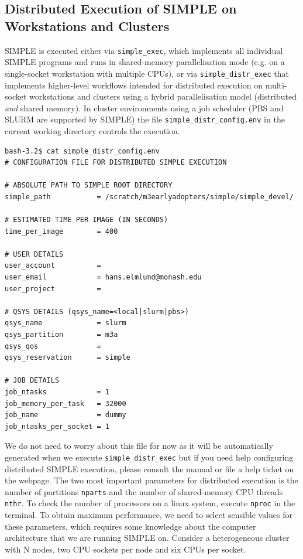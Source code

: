 \documentclass[a4paper,11pt]{article}
\begin{document}
\subsection{Distributed Execution of SIMPLE on Workstations and Clusters}
SIMPLE is executed either via \texttt{simple\_exec}, which implements all individual SIMPLE programs and runs in shared-memory parallelisation mode (e.g. on a single-socket workstation with multiple CPUs), or via \texttt{simple\_distr\_exec} that implements higher-level workflows intended for distributed execution on multi-socket workstations and clusters using a hybrid parallelisation model (distributed \textit{and} shared memory). In cluster environments using a job scheduler (PBS and SLURM are supported by SIMPLE) the file \texttt{simple\_distr\_config.env} in the current working directory controls the execution.
\begin{verbatim}
bash-3.2$ cat simple_distr_config.env 
# CONFIGURATION FILE FOR DISTRIBUTED SIMPLE EXECUTION

# ABSOLUTE PATH TO SIMPLE ROOT DIRECTORY
simple_path           = /scratch/m3earlyadopters/simple/simple_devel/

# ESTIMATED TIME PER IMAGE (IN SECONDS)
time_per_image        = 400

# USER DETAILS
user_account          = 
user_email            = hans.elmlund@monash.edu
user_project          = 

# QSYS DETAILS (qsys_name=<local|slurm|pbs>)
qsys_name             = slurm
qsys_partition        = m3a
qsys_qos              =
qsys_reservation      = simple

# JOB DETAILS
job_ntasks            = 1
job_memory_per_task   = 32000
job_name              = dummy
job_ntasks_per_socket = 1
\end{verbatim}
We do not need to worry about this file for now as it will be automatically generated when we execute \texttt{simple\_distr\_exec} but if you need help configuring distributed SIMPLE execution, please consult the manual or file a help ticket on the webpage. The two most important parameters for distributed execution is the number of partitions \texttt{nparts} and the number of shared-memory CPU threads \texttt{nthr}. To check the number of processors on a linux system, execute \texttt{nproc} in the terminal. To obtain maximum performance, we need to select sensible values for these parameters, which requires some knowledge about the computer architecture that we are running SIMPLE on.  Consider a heterogeneous cluster with N nodes, two CPU sockets per node and six CPUs per socket.
\end{document}
